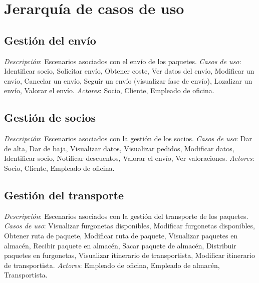 \section{Jerarquía de casos de uso}
\subsection{Gestión del envío}	
\textit{Descripción}: \newline
Escenarios asociados con el envío de los paquetes. \newline
\textit{Casos de uso}: \newline
 Identificar socio, Solicitar envío, Obtener coste, Ver datos del envío, Modificar un envío, Cancelar un envío, Seguir un envío (visualizar fase de envío), Lozalizar un envío, Valorar el envío. \newline
\textit{Actores}: \newline
Socio, Cliente, Empleado de oficina.
\subsection{Gestión de socios}	
\textit{Descripción}: \newline
Escenarios asociados con la gestión de los socios. \newline
\textit{Casos de uso}: \newline
 Dar de alta, Dar de baja, Visualizar datos, Visualizar pedidos, Modificar datos, Identificar socio, Notificar descuentos, Valorar el envío, Ver valoraciones. \newline
\textit{Actores}: \newline
Socio, Cliente, Empleado de oficina.
\subsection{Gestión del transporte}	
\textit{Descripción}: \newline
Escenarios asociados con la gestión del transporte de los paquetes. \newline
\textit{Casos de uso}: \newline
Visualizar furgonetas disponibles, Modificar furgonetas disponibles, Obtener ruta de paquete, Modificar ruta de paquete, Visualizar paquetes en almacén, Recibir paquete en almacén, Sacar paquete de almacén, Distribuir paquetes en furgonetas, Visualizar itinerario de transportista, Modificar itinerario de transportista. \newline
\textit{Actores}: \newline
Empleado de oficina, Empleado de almacén, Transportista.

